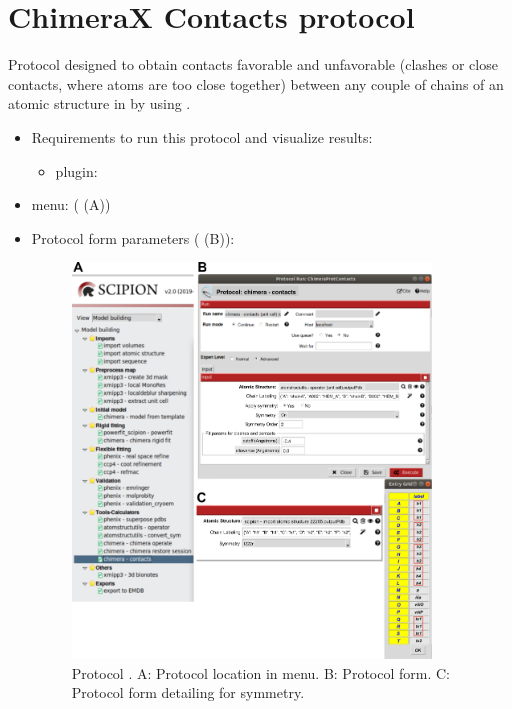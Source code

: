 \section{ChimeraX Contacts protocol}
\label{app:chimeraContactsProtocol}%

Protocol designed to obtain contacts favorable and unfavorable (clashes or close contacts, where atoms are too close together) between any couple of chains of an atomic structure in \scipion by using \chimera. 

 \begin{itemize}
  \item Requirements to run this protocol and visualize results:
    \begin{itemize}
        \item \scipion plugin: 
    \end{itemize}
  \item \scipion menu:
    ( (A))
  
  \item Protocol form parameters ( (B)):
  
  \begin{figure}[H]
     \centering 
     \captionsetup{width=.7\linewidth} 
     \includegraphics[width=0.90\textwidth]{Images_appendix/Fig155.pdf}
     \caption{Protocol . A: Protocol location in \scipion menu. B: Protocol form. C: Protocol form detailing  for  symmetry.}
     \label{fig:app_protocol_contacts_1}
    \end{figure}


\end{itemize}
